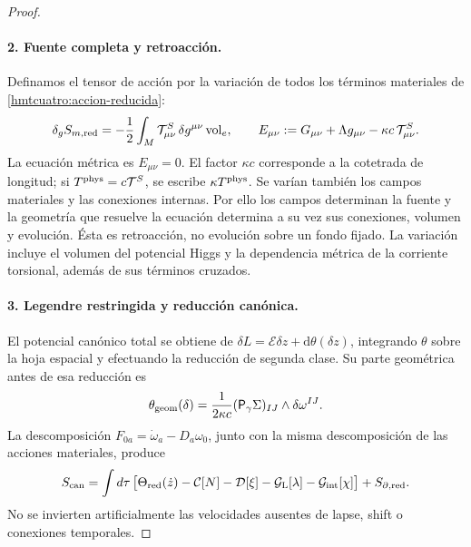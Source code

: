 \begin{proof}
\paragraph{2. Fuente completa y retroacción.}
Definamos el tensor de acción por la variación de todos los términos
materiales de \eqref{hmtcuatro:accion-reducida}:
\begin{equation}
 \delta_g S_{m,\rm red}=-\frac12\int_M
       \mathcal T^S_{\mu\nu}\,\delta g^{\mu\nu}\operatorname{vol}_e,
 \qquad
 E_{\mu\nu}:=G_{\mu\nu}+\Lambda g_{\mu\nu}
                   -\kappa c\,\mathcal T^S_{\mu\nu}.
 \label{hmtcuatro:fuente-completa}
\end{equation}
La ecuación métrica es \(E_{\mu\nu}=0\).
El factor \(\kappa c\) corresponde a la cotetrada de longitud;
si \(T^{\rm phys}=c\mathcal T^S\), se escribe \(\kappa T^{\rm phys}\).
Se varían también los campos materiales y las conexiones internas.
Por ello los campos determinan la fuente y la geometría que resuelve
la ecuación determina a su vez sus conexiones, volumen y evolución.
Ésta es retroacción, no evolución sobre un fondo fijado.
La variación incluye el volumen del potencial Higgs y la dependencia
métrica de la corriente torsional, además de sus términos cruzados.

\paragraph{3. Legendre restringida y reducción canónica.}
El potencial canónico total se obtiene de
\(\delta L=\mathcal E\delta z+\mathrm d\theta(\delta z)\),
integrando \(\theta\) sobre la hoja espacial y efectuando la reducción
de segunda clase. Su parte geométrica antes de esa reducción es
\[
 \theta_{\rm geom}(\delta)=
   \frac1{2\kappa c}(\mathsf P_\gamma\Sigma)_{IJ}
                       \wedge\delta\omega^{IJ}.
\]
La descomposición \(F_{0a}=\dot\omega_a-D_a\omega_0\), junto con la
misma descomposición de las acciones materiales, produce
\begin{equation}
 S_{\rm can}=\int d\tau\,
 \bigl[\Theta_{\rm red}(\dot z)-\mathcal C[N]-\mathcal D[\xi]
       -\mathcal G_{\rm L}[\lambda]-\mathcal G_{\rm int}[\chi]\bigr]
       +S_{\partial,\rm red}.
 \label{hmtcuatro:legendre-total}
\end{equation}
No se invierten artificialmente las velocidades ausentes de lapse,
shift o conexiones temporales.


\end{proof}
